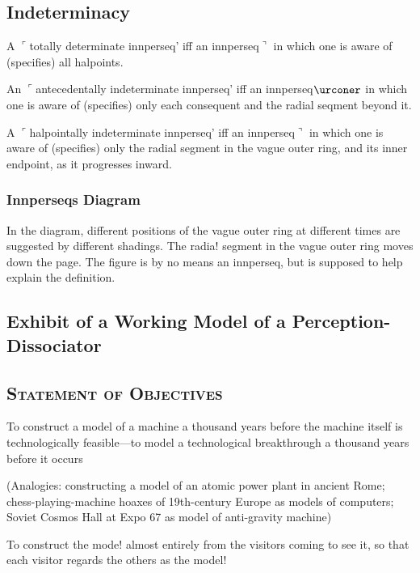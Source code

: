 \documentclass[10pt,twoside]{memoir}
\begin{document}
\begin{enumerate}
{\begin{enumerate}
\begin{sysrules}
\begin{sysrules}
\begin{sysrules}
\begin{sysrules}
{\begin{enumerate}
\section*{Indeterminacy}

\begin{sysrules}
A $\ulcorner$totally determinate innperseq' iff an innperseq$\urcorner$ in which one is aware of 
(specifies) all halpoints. 

An $\ulcorner$antecedentally indeterminate innperseq' iff an innperseq$\urconer$ in which one is 
aware of (specifies) only each consequent and the radial seqment beyond it. 

A $\ulcorner$halpointally indeterminate innperseq' iff an innperseq$\urcorner$ in which one is 
aware of (specifies) only the radial segment in the vague outer ring, and its 
inner endpoint, as it progresses inward. 

\subsection*{Innperseqs Diagram}

In the diagram, different positions of the vague outer ring at different times 
are suggested by different shadings. The radia! segment in the vague outer 
ring moves down the page. The figure is by no means an innperseq, but is 
supposed to help explain the definition. 


\chapter{Exhibit of a Working Model of a Perception-Dissociator}

\section{\textsc{Statement of Objectives}}

To construct a model of a machine a thousand years before the machine 
itself is technologically feasible---to model a technological breakthrough a 
thousand years before it occurs 

\begin{sysrules}
(Analogies: constructing a model of an atomic power plant in ancient 
Rome; chess-playing-machine hoaxes of 19th-century Europe as 
models of computers; Soviet Cosmos Hall at Expo 67 as model 
of anti-gravity machine) 

To construct the mode! almost entirely from the visitors coming to see it, so 
that each visitor regards the others as the model! 


\end{sysrules}
\end{sysrules}
\end{enumerate}}
\end{sysrules}
\end{sysrules}
\end{sysrules}
\end{sysrules}
\end{enumerate}}
\end{enumerate}
\end{document}
